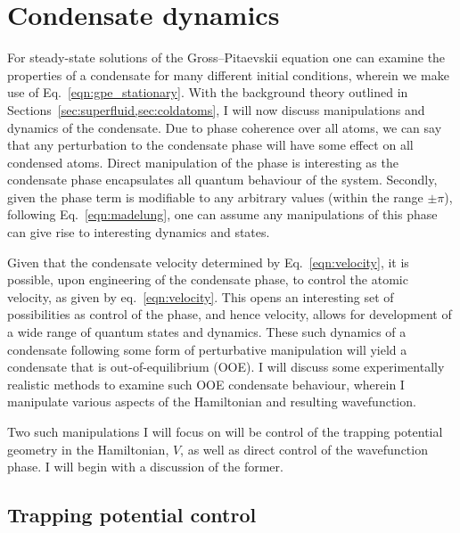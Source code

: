 \section{Condensate dynamics}
For steady-state solutions of the Gross--Pitaevskii equation one can examine the properties of a condensate for many different initial conditions, wherein we make use of Eq.~\ref{eqn:gpe_stationary}. With the background theory outlined in Sections~\ref{sec:superfluid,sec:coldatoms}, I will now discuss manipulations and dynamics of the condensate. Due to phase coherence over all atoms, we can say that any perturbation to the condensate phase will have some effect on all condensed atoms. Direct manipulation of the phase is interesting as the condensate phase encapsulates all quantum behaviour of the system. Secondly, given the phase term is modifiable to any arbitrary values (within the range $\pm \pi$), following Eq.~\ref{eqn:madelung}, one can assume any manipulations of this phase can give rise to interesting dynamics and states.

Given that the condensate velocity determined by Eq.~\ref{eqn:velocity}, it is possible, upon engineering of the condensate phase, to control the atomic velocity, as given by eq.~\ref{eqn:velocity}. This opens an interesting set of possibilities as control of the phase, and hence velocity, allows for development of a wide range of quantum states and dynamics. These such dynamics of a condensate following some form of perturbative manipulation will yield a condensate that is out-of-equilibrium (OOE). I will discuss some experimentally realistic methods to examine such OOE condensate behaviour, wherein I manipulate various aspects of the Hamiltonian and resulting wavefunction.

Two such manipulations I will focus on will be control of the trapping potential geometry in the Hamiltonian, $V$, as well as direct control of the wavefunction phase. I will begin with a discussion of the former.

\subsection{Trapping potential control}


